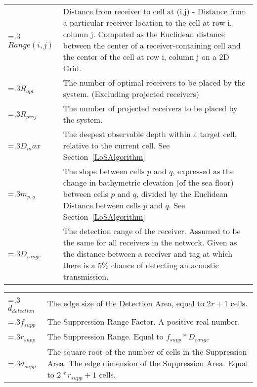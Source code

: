 \begin{tabularx}{\linewidth}{@{}>{\hsize=.3\hsize}X>{\hsize=1.5\hsize}X@{}}
	$Range(i,j)$ & Distance from receiver to cell at (i,j) - Distance from a particular receiver location to the cell at row i, column j.  Computed as the Euclidean distance between the center of a receiver-containing cell and the center of the cell at row i, column j on a 2D Grid.\\
	
	$R_{opt}$ & The number of optimal receivers to be placed by the system. (Excluding projected receivers)\\
	
	$R_{proj}$ & The number of projected receivers to be placed by the system.\\
	
	$D_max$& The deepest observable depth within a target cell, relative to the current cell. See Section~\ref{LoSAlgorithm}\\
	
	$m_{p,q}$&The slope between cells $p$ and $q$, expressed as the change in bathymetric elevation (of the sea floor) between cells $p$ and $q$, divided by the Euclidean Distance between cells $p$ and $q$. See Section~\ref{LoSAlgorithm}\\
	
	$D_{range}$ & The detection range of the receiver.  Assumed to be the same for all receivers in the network.  Given as the distance between a receiver and tag at which there is a 5\% chance of detecting an acoustic transmission.\\

\end{tabularx}

\noindent\begin{tabularx}{\linewidth}{@{}>{\hsize=.3\hsize}X>{\hsize=1.5\hsize}X@{}}
	
	$d_{detection}$& The edge size of the Detection Area, equal to $2r+1$ cells.\\
	$f_{supp}$ & The Suppression Range Factor.  A positive real number.\\
	$r_{supp}$ & The Suppression Range. Equal to $f_{supp}*D_{range}$\\
	$d_{supp}$ & The square root of the number of cells in the Suppression Area.  The edge dimension of the Suppression Area.  Equal to $2*r_{supp} + 1$ cells.\\
\end{tabularx}